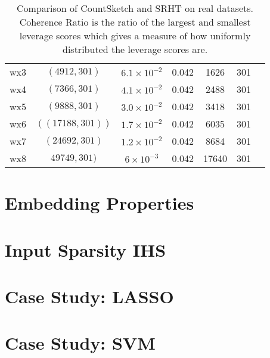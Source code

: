 \documentclass[twoside]{article}
\theoremstyle{definition}\newtheorem{thm}{Theorem}[section]
\theoremstyle{definition}\newtheorem{mydef}[thm]{Definition}
\theoremstyle{definition}\newtheorem{rem}[thm]{Remark}
\theoremstyle{definition}\newtheorem{prop}[thm]{Proposition}
\theoremstyle{definition}\newtheorem{example}[thm]{Example}
\theoremstyle{definition}\newtheorem{claim}[thm]{Claim}
\theoremstyle{definition}\newtheorem{Qu}[thm]{Question}
\theoremstyle{definition}\newtheorem{Lemma}[thm]{Lemma}
\theoremstyle{definition}\newtheorem{Cor}[thm]{Corollary}
\theoremstyle{definition}\newtheorem{Fact}[]{Fact}
\begin{document}
\begin{table}[ht]
\begin{adjustbox}{width=1\textwidth}
\begin{tabular}{|c|c|c|c|c|c|c|}
wx3 & $(4912, 301)$    & $6.1 \times 10^{-2}$ & 0.042 & 1626 & 301 & \cite{platt199912} \\

wx4 & $(7366, 301)$    & $4.1 \times 10^{-2}$ & 0.042 & 2488 & 301 & \cite{platt199912} \\

wx5 & $(9888, 301)$    & $3.0 \times 10^{-2}$ & 0.042 & 3418 & 301 & \cite{platt199912} \\

wx6 & $((17188, 301))$ & $1.7 \times 10^{-2}$ & 0.042 & 6035 & 301 & \cite{platt199912} \\

wx7 & $(24692, 301)$   & $1.2 \times 10^{-2}$ & 0.042 & 8684 & 301 & \cite{platt199912} \\

wx8 & $49749, 301)$    & $6 \times 10^{-3}$   & 0.042 & 17640 & 301 & \cite{platt199912} \\ 
\hline
\end{tabular}
\end{adjustbox}
\caption{Comparison of CountSketch and SRHT on real datasets.
Coherence Ratio is the ratio of the largest and smallest leverage scores which
gives a measure of how uniformly distributed the leverage scores are.}
\label{table: data-facts}
\end{table}




\section{Embedding Properties} \label{sec: subspace-embedding-results}



\section{Input Sparsity IHS} \label{sec: countsketch-ihs}







\section{Case Study: LASSO} \label{sec: ihs-lasso}


\section{Case Study: SVM}
\end{document}

